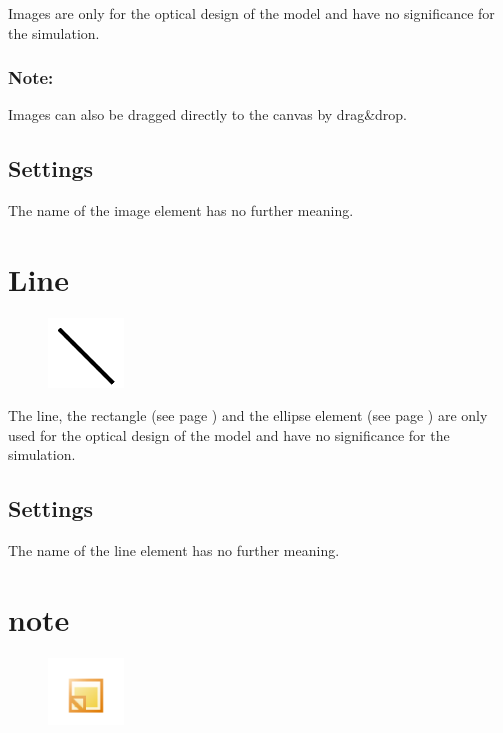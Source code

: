 Images are only for the optical design of the model and have no significance for the simulation.

\subsubsection*{Note:}

Images can also be dragged directly to the canvas by drag\&drop.

\subsection*{Settings}

The name of the image element has no further meaning.


\section{Line}
\label{ref:ModelElementLine}

\begin{figure}
\vspace{-22pt}
\includegraphics[width=2cm]{imageModelElementLine.png}
\vspace{-22pt}
\end{figure}

The line, the rectangle (see page \pageref{ref:ModelElementRectangle}) and the
ellipse element (see page \pageref{ref:ModelElementEllipse}) 
are only used for the optical design of the model and have no significance for the simulation.

\subsection*{Settings}

The name of the line element has no further meaning.


\section{note}
\label{ref:ModelElementNote}

\begin{figure}
\vspace{-22pt}
\includegraphics[width=2cm]{imageModelElementNote.png}
\vspace{-22pt}
\end{figure}

